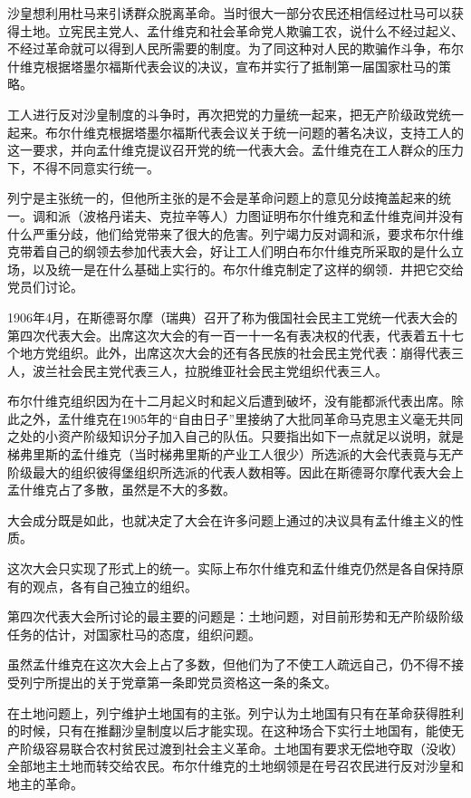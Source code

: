 沙皇想利用杜马来引诱群众脱离革命。当时很大一部分农民还相信经过杜马可以获得土地。立宪民主党人、孟什维克和社会革命党人欺骗工农，说什么不经过起义、不经过革命就可以得到人民所需要的制度。为了同这种对人民的欺骗作斗争，布尔什维克根据塔墨尔福斯代表会议的决议，宣布并实行了抵制第一届国家杜马的策略。

工人进行反对沙皇制度的斗争时，再次把党的力量统一起来，把无产阶级政党统一起来。布尔什维克根据塔墨尔福斯代表会议关于统一问题的著名决议，支持工人的这一要求，并向孟什维克提议召开党的统一代表大会。孟什维克在工人群众的压力下，不得不同意实行统一。

列宁是主张统一的，但他所主张的是不会是革命问题上的意见分歧掩盖起来的统一。调和派（波格丹诺夫、克拉辛等人）力图证明布尔什维克和孟什维克间并没有什么严重分歧，他们给党带来了很大的危害。列宁竭力反对调和派，要求布尔什维克带着自己的纲领去参加代表大会，好让工人们明白布尔什维克所采取的是什么立场，以及统一是在什么基础上实行的。布尔什维克制定了这样的纲领．井把它交给党员们讨论。

1906年4月，在斯德哥尔摩（瑞典）召开了称为俄国社会民主工党统一代表大会的第四次代表大会。出席这次大会的有一百一十一名有表决权的代表，代表着五十七个地方党组织。此外，出席这次大会的还有各民族的社会民主党代表：崩得代表三人，波兰社会民主党代表三人，拉脱维亚社会民主党组织代表三人。

布尔什维克组织因为在十二月起义时和起义后遭到破坏，没有能都派代表出席。除此之外，孟什维克在1905年的“自由日子”里接纳了大批同革命马克思主义毫无共同之处的小资产阶级知识分子加入自己的队伍。只要指出如下一点就足以说明，就是梯弗里斯的孟什维克（当时梯弗里斯的产业工人很少）所选派的大会代表竟与无产阶级最大的组织彼得堡组织所选派的代表人数相等。因此在斯德哥尔摩代表大会上孟什维克占了多散，虽然是不大的多数。

大会成分既是如此，也就决定了大会在许多问题上通过的决议具有孟什维主义的性质。

这次大会只实现了形式上的统一。实际上布尔什维克和孟什维克仍然是各自保持原有的观点，各有自己独立的组织。

第四次代表大会所讨论的最主要的问题是：土地问题，对目前形势和无产阶级阶级任务的估计，对国家杜马的态度，组织问题。

虽然孟什维克在这次大会上占了多数，但他们为了不使工人疏远自己，仍不得不接受列宁所提出的关于党章第一条即党员资格这一条的条文。

在土地问题上，列宁维护土地国有的主张。列宁认为土地国有只有在革命获得胜利的时候，只有在推翻沙皇制度以后才能实现。在这种场合下实行土地国有，能使无产阶级容易联合农村贫民过渡到社会主义革命。土地国有要求无偿地夺取（没收）全部地主土地而转交给农民。布尔什维克的土地纲领是在号召农民进行反对沙皇和地主的革命。


